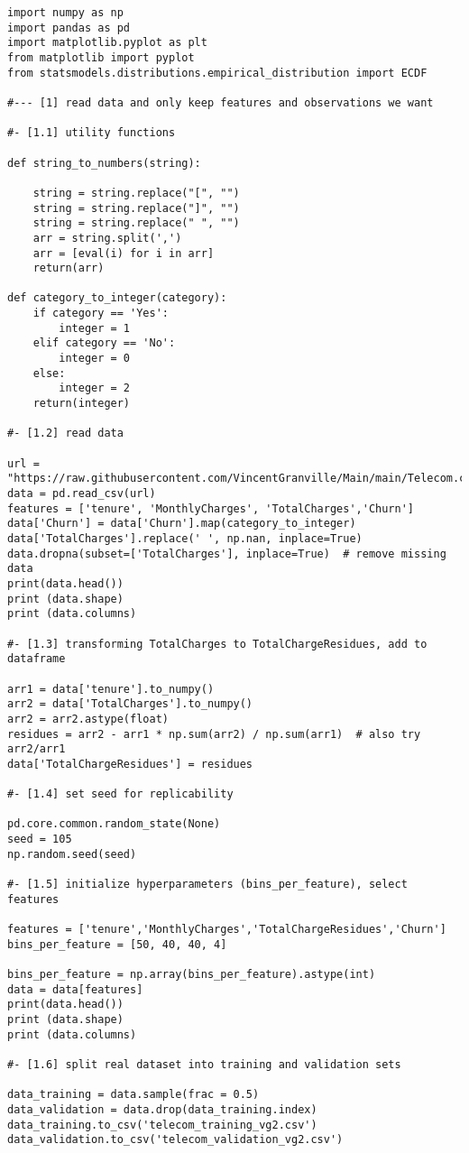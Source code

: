 \documentclass[oneside,10pt]{book}
\begin{document}
\begin{lstlisting}
import numpy as np
import pandas as pd
import matplotlib.pyplot as plt
from matplotlib import pyplot
from statsmodels.distributions.empirical_distribution import ECDF

#--- [1] read data and only keep features and observations we want

#- [1.1] utility functions

def string_to_numbers(string):

    string = string.replace("[", "")
    string = string.replace("]", "")
    string = string.replace(" ", "")
    arr = string.split(',')
    arr = [eval(i) for i in arr]
    return(arr)

def category_to_integer(category):
    if category == 'Yes':
        integer = 1
    elif category == 'No':
        integer = 0
    else:
        integer = 2
    return(integer)

#- [1.2] read data

url = "https://raw.githubusercontent.com/VincentGranville/Main/main/Telecom.csv"
data = pd.read_csv(url)
features = ['tenure', 'MonthlyCharges', 'TotalCharges','Churn']
data['Churn'] = data['Churn'].map(category_to_integer)
data['TotalCharges'].replace(' ', np.nan, inplace=True)
data.dropna(subset=['TotalCharges'], inplace=True)  # remove missing data
print(data.head())
print (data.shape)
print (data.columns)

#- [1.3] transforming TotalCharges to TotalChargeResidues, add to dataframe

arr1 = data['tenure'].to_numpy()
arr2 = data['TotalCharges'].to_numpy()
arr2 = arr2.astype(float)
residues = arr2 - arr1 * np.sum(arr2) / np.sum(arr1)  # also try arr2/arr1
data['TotalChargeResidues'] = residues

#- [1.4] set seed for replicability

pd.core.common.random_state(None)
seed = 105
np.random.seed(seed)

#- [1.5] initialize hyperparameters (bins_per_feature), select features

features = ['tenure','MonthlyCharges','TotalChargeResidues','Churn']
bins_per_feature = [50, 40, 40, 4]

bins_per_feature = np.array(bins_per_feature).astype(int)
data = data[features]
print(data.head())
print (data.shape)
print (data.columns)

#- [1.6] split real dataset into training and validation sets

data_training = data.sample(frac = 0.5)
data_validation = data.drop(data_training.index)
data_training.to_csv('telecom_training_vg2.csv')
data_validation.to_csv('telecom_validation_vg2.csv')


\end{lstlisting}
\end{document}
